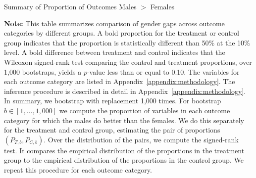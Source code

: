 \begin{sidewaystable}[!htbp]
\centering
\begin{threeparttable}
\caption{Summary of Proportion of Outcomes Males $>$ Females}
 \label{tab:proportion-table-ranksign}
 
 \begin{tablenotes}
 \footnotesize
\item \textbf{Note:} This table summarizes comparison of gender gaps across outcome categories by different groups. A bold proportion for the treatment or control group indicates that the proportion is statistically different than 50\% at the 10\% level. A bold difference between treatment and control indicates that the Wilcoxon signed-rank test comparing the control and treatment proportions, over 1,000 bootstraps, yields a $p$-value less than or equal to 0.10. The variables for each outcome category are listed in Appendix~\ref{appendix:methodology}. The inference procedure is described in detail in Appendix~\ref{appendix:methodology}. In summary, we bootstrap with replacement 1,000 times. For bootstrap $b \in [1, \ldots, 1,000]$ we compute the proportion of variables in each outcome category for which the males do better than the females. We do this separately for the treatment and control group, estimating the pair of proportions $(P_{T,b}, P_{C,b})$. Over the distribution of the pairs, we compute the signed-rank test. It compares the empirical distribution of the proportions in the treatment group to the empirical distribution of the proportions in the control group. We repeat this procedure for each outcome category.\end{tablenotes}
\end{threeparttable}
\end{sidewaystable}

\clearpage






